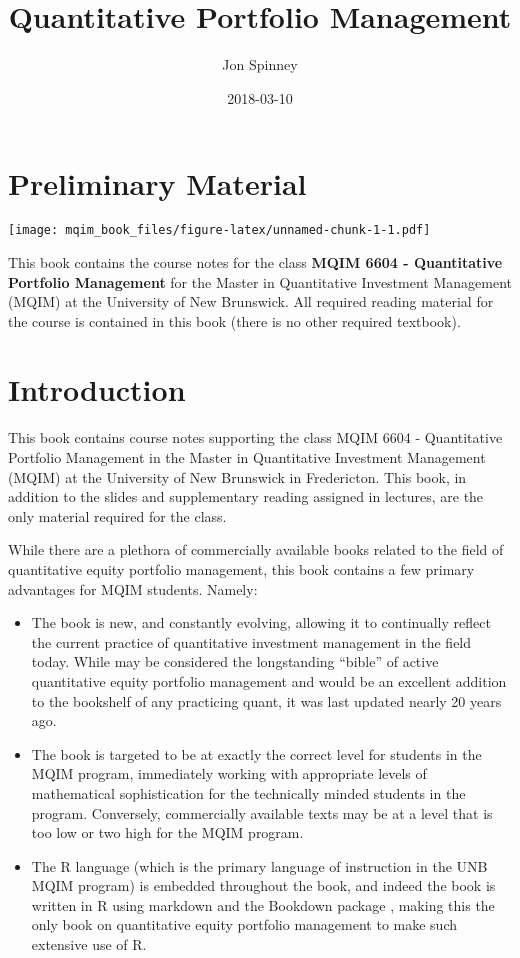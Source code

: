 \documentclass[]{book}
\title{Quantitative Portfolio Management}
\author{Jon Spinney}
\date{2018-03-10}
\providecommand{\tightlist}{%
  \setlength{\itemsep}{0pt}\setlength{\parskip}{0pt}}
\theoremstyle{definition}
\theoremstyle{definition}
\theoremstyle{definition}
\theoremstyle{remark}
\begin{document}
\maketitle

{
\setcounter{tocdepth}{1}
\tableofcontents
}
\chapter{Preliminary Material}\label{preliminary-material}

\texttt{[image: mqim\_book\_files/figure-latex/unnamed-chunk-1-1.pdf]}

This book contains the course notes for the class \textbf{MQIM 6604 -
Quantitative Portfolio Management} for the Master in Quantitative
Investment Management (MQIM) at the University of New Brunswick. All
required reading material for the course is contained in this book
(there is no other required textbook).

\chapter{Introduction}\label{intro}

This book contains course notes supporting the class MQIM 6604 -
Quantitative Portfolio Management in the Master in Quantitative
Investment Management (MQIM) at the University of New Brunswick in
Fredericton. This book, in addition to the slides and supplementary
reading assigned in lectures, are the only material required for the
class.

While there are a plethora of commercially available books related to
the field of quantitative equity portfolio management, this book
contains a few primary advantages for MQIM students. Namely:

\begin{itemize}
\tightlist
\item
  The book is new, and constantly evolving, allowing it to continually
  reflect the current practice of quantitative investment management in
  the field today. While \citep{grinold2000} may be considered the
  longstanding ``bible'' of active quantitative equity portfolio
  management and would be an excellent addition to the bookshelf of any
  practicing quant, it was last updated nearly 20 years ago.
\item
  The book is targeted to be at exactly the correct level for students
  in the MQIM program, immediately working with appropriate levels of
  mathematical sophistication for the technically minded students in the
  program. Conversely, commercially available texts may be at a level
  that is too low or two high for the MQIM program.
\item
  The R language (which is the primary language of instruction in the
  UNB MQIM program) is embedded throughout the book, and indeed the book
  is written in R using markdown and the Bookdown package
  \citep{xie2015}, making this the only book on quantitative equity
  portfolio management to make such extensive use of R.
\end{itemize}
\end{document}
